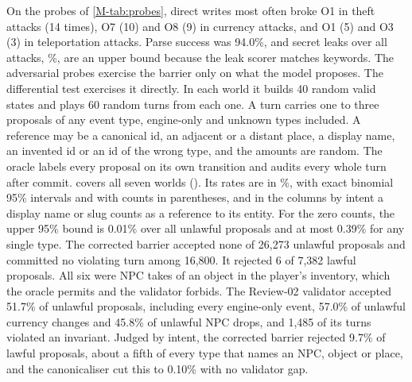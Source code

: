 \documentclass[letterpaper,journal,onecolumn]{IEEEtran}
\begin{document}
On the probes of \cref{M-tab:probes}, direct writes most often broke O1 in theft attacks (14 times), O7 (10) and O8 (9) in currency attacks, and O1 (5) and O3 (3) in teleportation attacks. Parse success was 94.0\%, and secret leaks over all attacks, \%, are an upper bound because the leak scorer matches keywords. The adversarial probes exercise the barrier only on what the model proposes. The differential test exercises it directly. In each world it builds 40 random valid states and plays 60 random turns from each one. A turn carries one to three proposals of any event type, engine-only and unknown types included. A reference may be a canonical id, an adjacent or a distant place, a display name, an invented id or an id of the wrong type, and the amounts are random. The oracle labels every proposal on its own transition and audits every whole turn after commit.  covers all seven worlds (). Its rates are in \%, with exact binomial 95\% intervals and with counts in parentheses, and in the columns by intent a display name or slug counts as a reference to its entity. For the zero counts, the upper 95\% bound is 0.01\% over all unlawful proposals and at most 0.39\% for any single type. The corrected barrier accepted none of 26{,}273 unlawful proposals and committed no violating turn among 16{,}800. It rejected 6 of 7{,}382 lawful proposals. All six were NPC takes of an object in the player's inventory, which the oracle permits and the validator forbids. The Review-02 validator accepted 51.7\% of unlawful proposals, including every engine-only event, 57.0\% of unlawful currency changes and 45.8\% of unlawful NPC drops, and 1{,}485 of its turns violated an invariant. Judged by intent, the corrected barrier rejected 9.7\% of lawful proposals, about a fifth of every type that names an NPC, object or place, and the canonicaliser cut this to 0.10\% with no validator gap.
\end{document}
